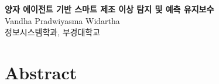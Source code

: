 \documentclass[11pt]{report}
\begin{document}
\pagestyle{plain}


\thispagestyle{empty}


\newpage
\thispagestyle{empty}


\newpage
\setcounter{page}{1}


\newpage
{}
\listoftables

\newpage
{}
\listoffigures

\newpage
% 
\vspace{1em}
\begingroup
\let\clearpage\relax
\let\cleardoublepage\relax
\begin{center}
{\large \textbf{양자 에이전트 기반 스마트 제조 이상 탐지 및 예측 유지보수}}\\[0.8em]
Vandha Pradwiyasma Widartha\\[0.2em]
정보시스템학과, 부경대학교\\[0.2em]
\end{center}
\vspace{1em}
\chapter*{Abstract}

\endgroup
\end{document}
